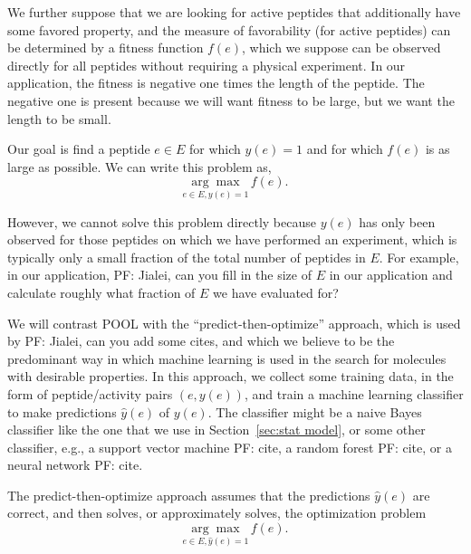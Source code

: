 \documentclass[11pt]{article}
\newcommand{\pfcomment}[1]{\color{blue} PF: #1}
\begin{document}
We further suppose that we are looking for active peptides that additionally have some
favored property, and the measure of favorability (for active peptides) can be
determined by a fitness function $f(e)$, which we suppose can be observed directly for all peptides without requiring a physical experiment. In our application, the fitness is negative one times the length of the peptide.  The negative one is present because we will want fitness to be large, but we want the length to be small.

Our goal is find a peptide $e\in E$ for which $y(e)=1$ and for which $f(e)$ is as large as possible.  We can write this problem as,
\begin{equation}
  \underset{e \in E, y(e) = 1}{\arg\max} \, f(e).
  \label{eq:general problem}
\end{equation}

However, we cannot solve this problem directly because $y(e)$ has only been observed for those peptides on which we have performed an experiment, which is typically only a small fraction of the total number of peptides in $E$.  For example, in our application, \pfcomment{Jialei, can you fill in the size of $E$ in our application and calculate roughly what fraction of $E$ we have evaluated for?} 

We will contrast POOL with the \enquote{predict-then-optimize} approach, which is used by \pfcomment{Jialei, can you add some cites}, and which we believe to be the predominant way in which machine learning is used in the search for molecules with desirable properties.  In this approach, we collect some training data, in the form of peptide/activity pairs $(e,y(e))$, and train a machine learning classifier to make predictions $\hat{y}(e)$ of $y(e)$.  The classifier might be a naive Bayes classifier like the one that we use in Section~\ref{sec:stat model}, or some other classifier, e.g., a support vector machine \pfcomment{cite}, a random forest \pfcomment{cite}, or a neural network\pfcomment{cite}.

The predict-then-optimize approach assumes that the predictions $\hat{y}(e)$ are correct, and then solves, or approximately solves, the optimization problem 
\begin{equation*}
  \underset{e \in E, \hat{y}(e) = 1}{\arg\max} \, f(e).
  \label{}
\end{equation*}
\end{document}
